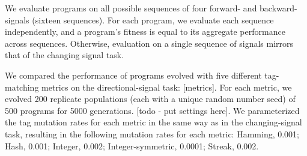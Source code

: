 We evaluate programs on all possible sequences of four forward- and backward-signals (sixteen sequences).
For each program, we evaluate each sequence independently, and a program's fitness is equal to its aggregate
performance across sequences.
Otherwise, evaluation on a single sequence of signals mirrors that of the changing signal task.

We compared the performance of programs evolved with five different tag-matching metrics on the directional-signal
task: [metrics].
For each metric, we evolved 200 replicate populations (each with a unique random number seed) of 500
programs for 5000 generations.
[todo - put settings here].
We parameterized the tag mutation rates for each metric in the same way as in the changing-signal task,
resulting in the following mutation rates for each metric:
Hamming, 0.001; Hash, 0.001; Integer, 0.002; Integer-symmetric, 0.0001; Streak, 0.002.
